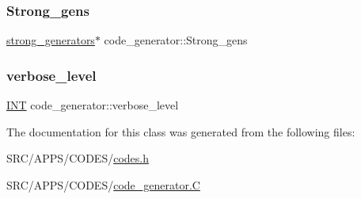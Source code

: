 \mbox{\label{classcode__generator_a32849f7e089db573773a78a39c33b471}} 
\subsubsection{\texorpdfstring{Strong\+\_\+gens}{Strong\_gens}}
{\footnotesize\ttfamily \mbox{\hyperlink{classstrong__generators}{strong\+\_\+generators}}$\ast$ code\+\_\+generator\+::\+Strong\+\_\+gens}

\mbox{\label{classcode__generator_a603e29bac4d2fb4de7237ac66405c9c1}} 
\subsubsection{\texorpdfstring{verbose\+\_\+level}{verbose\_level}}
{\footnotesize\ttfamily \mbox{\hyperlink{galois_8h_a09fddde158a3a20bd2dcadb609de11dc}{I\+NT}} code\+\_\+generator\+::verbose\+\_\+level}



The documentation for this class was generated from the following files\+:\begin{DoxyCompactItemize}
\item 
S\+R\+C/\+A\+P\+P\+S/\+C\+O\+D\+E\+S/\mbox{\hyperlink{codes_8h}{codes.\+h}}\item 
S\+R\+C/\+A\+P\+P\+S/\+C\+O\+D\+E\+S/\mbox{\hyperlink{code__generator_8_c}{code\+\_\+generator.\+C}}\end{DoxyCompactItemize}
